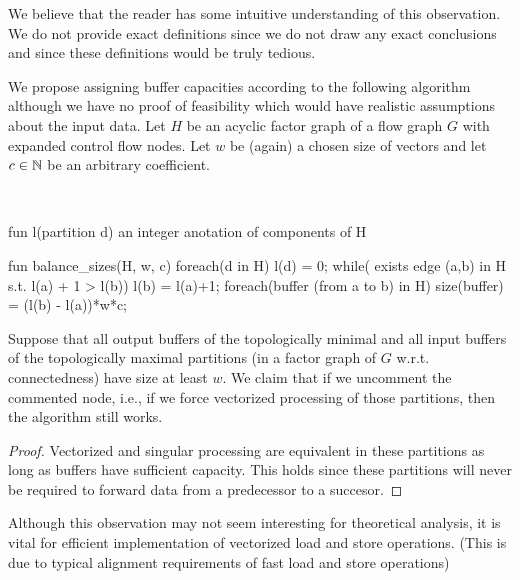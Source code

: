 We believe that the reader has some intuitive understanding of this observation. We do not provide exact definitions since we do not draw any exact conclusions and since these definitions would be truly tedious.


We propose assigning buffer capacities according to the following algorithm although we have no proof of feasibility which would have realistic assumptions about the input data. Let $H$ be an acyclic factor graph of a flow graph $G$ with expanded control flow nodes. Let $w$ be (again) a chosen size of vectors and let $c \in \mathbb{N}$ be an arbitrary coefficient.

\ 
\begin{samepage}
\begin{code}
fun l(partition d) { an integer anotation of components of H}

fun balance_sizes(H, w, c)
{
  foreach(d in H)
    l(d) = 0;
  while( exists edge (a,b) in H s.t. l(a) + 1 > l(b))
    l(b) = l(a)+1;
  foreach(buffer (from a to b) in H)
  {
    size(buffer) = (l(b) - l(a))*w*c;
  }
}
\end{code}
\end{samepage}
\myendalg

  Suppose that all output buffers of the topologically minimal and all input buffers of the topologically maximal partitions (in a factor graph of $G$ w.r.t. connectedness) have size at least $w$. We claim that if we uncomment the commented node, i.e., if we force vectorized processing of those partitions, then the algorithm still works.
  \begin{proof}
    Vectorized and singular processing are equivalent in these partitions as long as buffers have sufficient capacity. This holds since these partitions will never be required to forward data from a predecessor to a succesor. 
  \end{proof}
\myendobs

\begin{rem} 
  Although this observation may not seem interesting for theoretical analysis, it is vital for efficient implementation of vectorized load and store operations. (This is due to typical alignment requirements of fast load and store operations)
\end{rem}


